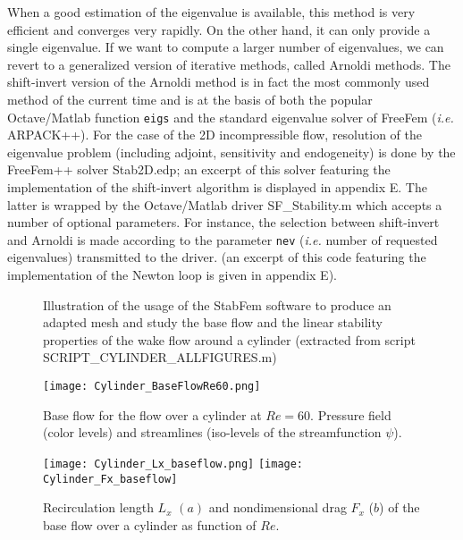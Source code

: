 \documentclass[twocolumn,10pt]{asme2ej}
\begin{document}
When a good estimation of the eigenvalue is available, this method is very efficient and converges very rapidly. On the other hand, it can only provide a single eigenvalue. If we want to compute a larger number of eigenvalues, we can revert to a generalized version of iterative methods, called Arnoldi methods\cite{Arnoldi51}. The shift-invert version of the Arnoldi method is in fact the most commonly used method of the current time and is at the basis of both the popular Octave/Matlab function {\tt{eigs}} and the standard eigenvalue solver of FreeFem (\textit{i.e.} ARPACK++). 
For the case of the 2D incompressible flow, resolution of the eigenvalue problem (including adjoint, sensitivity and endogeneity) is done by the FreeFem++ solver {\sf  Stab2D.edp}; an excerpt of this solver featuring the implementation of the shift-invert algorithm is displayed in appendix E. The latter is wrapped by the Octave/Matlab driver {\sf  SF\_Stability.m} which accepts a number of optional parameters. For instance, the selection between shift-invert and Arnoldi is made according to the parameter \verb|nev|  (\textit{i.e.} number of requested eigenvalues) transmitted to the driver.
(an excerpt of this code featuring the implementation of the Newton loop is given in appendix E).


\begin{figure*}[t]
\small

 \normalsize
\caption{Illustration of the usage of the StabFem software to produce an adapted mesh and study the base flow and the linear stability properties of the wake flow around a cylinder 
(extracted from script {\sf  SCRIPT\_CYLINDER\_ALLFIGURES.m})}
\label{Listing2}
\end{figure*}


\begin{figure}
\texttt{[image: Cylinder\_BaseFlowRe60.png]}
\caption{Base flow for the flow over a cylinder at $Re=60$. Pressure field (color levels) and streamlines (iso-levels of the streamfunction $\psi$). }
\label{fig:Baseflow}
\end{figure}

\begin{figure}
\texttt{[image: Cylinder\_Lx\_baseflow.png]}
\texttt{[image: Cylinder\_Fx\_baseflow]}
\caption{Recirculation length $L_x$ $(a)$  and nondimensional drag $F_x$ ($b$) of the base flow over a cylinder as function of $Re$.}
\label{fig:LxandDrag}
\end{figure}
\end{document}
